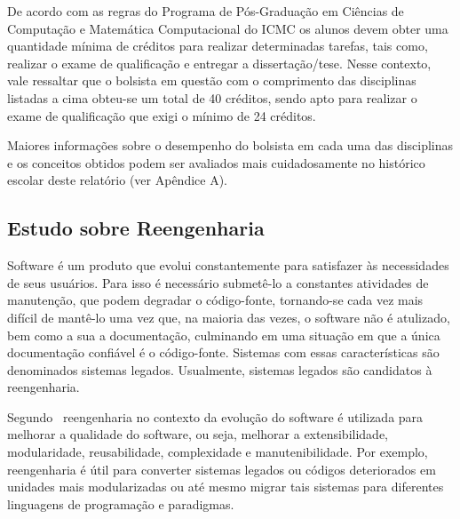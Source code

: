 De acordo com as regras do Programa de Pós-Graduação em Ciências de Computação e Matemática Computacional do ICMC os alunos devem obter uma quantidade mínima de créditos para realizar determinadas tarefas, tais como, realizar o exame de qualificação e entregar a dissertação/tese. Nesse contexto, vale ressaltar que o bolsista em questão com o comprimento das disciplinas listadas a cima obteu-se um total de 40 créditos, sendo apto para realizar o exame de qualificação que exigi o mínimo de 24 créditos.%

Maiores informações sobre o desempenho do bolsista em cada uma das disciplinas e os conceitos obtidos podem ser avaliados mais cuidadosamente no histórico escolar deste relatório (ver Apêndice A).


\subsection{Estudo sobre Reengenharia} %
\label{sub:reengenharia}


Software é um produto que evolui constantemente para satisfazer às necessidades de seus usuários. Para isso é necessário submetê-lo a constantes atividades de manutenção, que podem degradar o código-fonte, tornando-se cada vez mais difícil de mantê-lo uma vez que, na maioria das vezes, o software não é atulizado, bem como a sua a documentação, culminando em uma situação em que a única documentação confiável é o código-fonte. Sistemas com essas características são denominados sistemas legados. Usualmente, sistemas legados são candidatos à reengenharia.


Segundo~\citet{refactImpro} reengenharia no contexto da evolução do software é utilizada para melhorar a qualidade do software, ou seja, melhorar a extensibilidade, modularidade, reusabilidade, complexidade e manutenibilidade. Por exemplo, reengenharia é útil para converter sistemas legados ou códigos deteriorados em unidades mais modularizadas ou até mesmo migrar tais sistemas para diferentes linguagens de programação e paradigmas.


